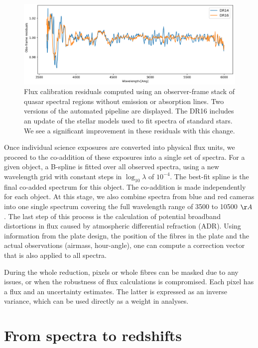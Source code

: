 \begin{figure}
    \centering
    \includegraphics[width=\textwidth]{fig/spectro/picca_calibration_residuals_DR14_DR16_civ.png}
    \caption{Flux calibration residuals computed using an observer-frame stack of 
    quasar spectral regions without emission or absorption lines. 
    Two versions of the automated pipeline are displayed. The DR16 includes an 
    update of the stellar models used to fit spectra of standard stars. 
    We see a significant improvement in these residuals with this change. }
    \label{fig:flux_calibration_residuals}
\end{figure}

Once individual science exposures are converted into physical flux units, 
we proceed to the co-addition of these exposures into a single set of spectra. 
For a given object, a B-spline is fitted over all observed spectra, 
using a new wavelength grid with constant steps in $\log_{10} \lambda$ of $10^{-4}$. 
The best-fit spline is the final co-added spectrum for this object. 
The co-addition is made independently for each object. 
At this stage, we also combine spectra from blue and red cameras into 
one single spectrum covering the full wavelength range of 3500 to 10500 $\AA$. 
The last step of this process is the calculation of potential broadband 
distortions in flux caused by atmospheric differential refraction (ADR). 
Using information from the plate design, the position of the fibres in 
the plate and the actual observations (airmass, hour-angle), one can 
compute a correction vector that is also applied to all spectra. 

During the whole reduction, pixels or whole fibres can be masked due to any issues, 
or when the robustness of flux calculations is compromised. 
Each pixel has a flux and an uncertainty estimates. The latter is expressed 
as an inverse variance, which can be used directly as a weight in analyses.



\section{From spectra to redshifts}
\label{spectro:pipeline1d}

